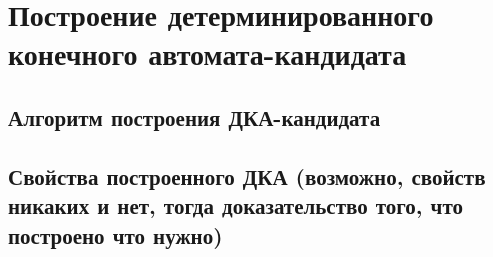 \chapter{Построение детерминированного конечного автомата-кандидата} \label{chapt3}

\section{Алгоритм построения ДКА-кандидата} \label{sect3_1}

\section{Свойства построенного ДКА (возможно, свойств никаких и нет, тогда доказательство того, что построено что нужно)} \label{sect3_2}

\clearpage